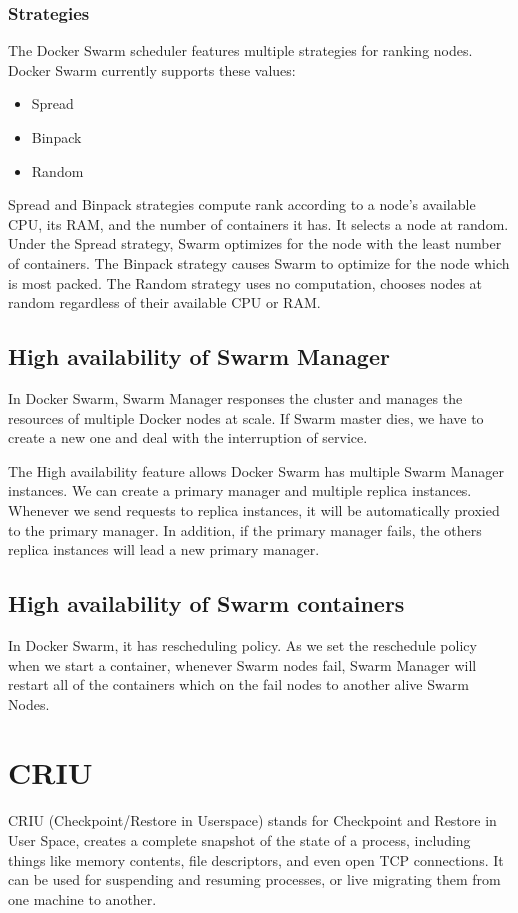 \subsubsection{Strategies}
The Docker Swarm scheduler features multiple strategies for ranking nodes. Docker Swarm currently supports these values:
\begin{itemize}
    \item Spread
    \item Binpack
    \item Random
\end{itemize}
Spread and Binpack strategies compute rank according to a node’s available CPU, its RAM, and the number of containers it has. It selects a node at random.
Under the Spread strategy, Swarm optimizes for the node with the least number of containers.
The Binpack strategy causes Swarm to optimize for the node which is most packed.
The Random strategy uses no computation, chooses nodes at random regardless of their available CPU or RAM.

\subsection{High availability of Swarm Manager}
In Docker Swarm, Swarm Manager responses the cluster and manages the resources of multiple Docker nodes at scale. If Swarm master dies, we have to create a new one and deal with the interruption of service.

The High availability feature allows Docker Swarm has multiple Swarm Manager instances. We can create a primary manager and multiple replica instances.
Whenever we send requests to replica instances, it will be automatically proxied to the primary manager.
In addition, if the primary manager fails, the others replica instances will lead a new primary manager.

\subsection{High availability of Swarm containers}
In Docker Swarm, it has rescheduling policy. As we set the reschedule policy when we start a container, whenever Swarm nodes fail, Swarm Manager will restart all of the containers which on the fail nodes to another alive Swarm Nodes.

\section{CRIU}
CRIU \cite{CRIU} (Checkpoint/Restore in Userspace) stands for Checkpoint and Restore in User Space, creates a complete snapshot of the state of a process, including things like memory contents, file descriptors, and even open TCP connections. It can be used for suspending and resuming processes, or live migrating them from one machine to another.

